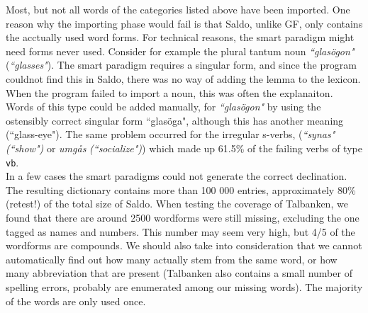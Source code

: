 \documentclass{report}
\begin{document}
%
Most, but not all words of the categories listed above have been imported.
One reason why the importing phase would fail 
is that Saldo, unlike GF, only contains the acctually used word forms.
For technical reasons, the smart paradigm might need forms never used.
Consider for example
the plural tantum %
noun \emph{``glasögon"} (\emph{``glasses"}).
The smart paradigm requires a singular form, and since the program couldnot
find this in Saldo, there was no way of adding the lemma to the lexicon. 
When the program failed to import a noun, this was often the explanaiton.
Words of this type could be added manually, for \emph{``glasögon"} by using the
ostensibly correct singular form ``glasöga", although this
has another meaning (``glass-eye").
The same problem occurred for the irregular s-verbs,
(\emph{``synas"} \emph{(``show")} or \emph{umgås} \emph{(``socialize")})
which made up 61.5\% of the failing verbs of type \verb_vb_.\\
In a few cases the smart paradigms could not generate the correct declination.\\


The resulting dictionary contains more than 100 000 entries, approximately 80\% (retest!)
of the total size of Saldo.
When testing the coverage of Talbanken,
we found that there are around 2500 wordforms were still missing, excluding the one
tagged as names and numbers. This number may seem very high, but %
4/5 of the wordforms are compounds. We should also take into consideration that 
we cannot automatically find out how many actually stem from the same word, or
how many abbreviation that are present (Talbanken also contains a small number of 
spelling errors, probably are enumerated among our missing words). The majority
of the words are only used once.\\
\end{document}
